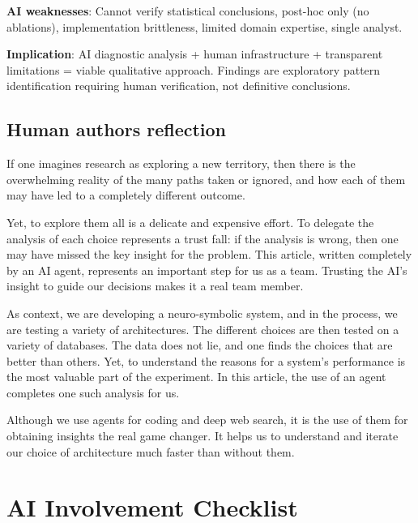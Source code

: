\documentclass[12pt,a4paper]{article}
\begin{document}
\noindent
\textbf{AI weaknesses}: Cannot verify statistical conclusions, post-hoc only (no ablations), implementation brittleness, limited domain expertise, single analyst.

\noindent
\textbf{Implication}: AI diagnostic analysis + human infrastructure + transparent limitations = viable qualitative approach. Findings are exploratory pattern identification requiring human verification, not definitive conclusions.

\subsection{Human authors reflection}

If one imagines research as exploring a new territory, then there is the overwhelming reality of the many paths taken or ignored, and how each of them may have led to a completely different outcome. 

Yet, to explore them all is a delicate and expensive effort. To delegate the analysis of each choice represents a trust fall: if the analysis is wrong, then one may have missed the key insight for the problem. This article, written completely by an AI agent, represents an important step for us as a team. Trusting the AI's insight to guide our decisions makes it a real team member.

As context, we are developing a neuro-symbolic system, and in the process, we are testing a variety of architectures. The different choices are then tested on a variety of databases. The data does not lie, and one finds the choices that are better than others. Yet, to understand the reasons for a system's performance is the most valuable part of the experiment. In this article, the use of an agent completes one such analysis for us. 

Although we use agents for coding and deep web search, it is the use of them for obtaining insights the real game changer. It helps us  to understand and iterate our choice of architecture much faster than without them.



\section{AI Involvement Checklist}
\end{document}
